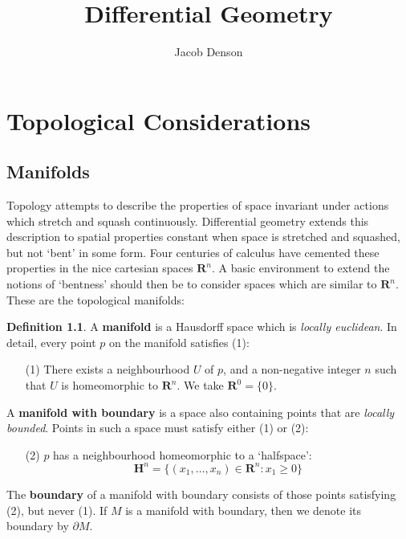 \documentclass[12pt]{report}
\title{Differential Geometry}
\author{Jacob Denson}
\theoremstyle{plain}
\theoremstyle{definition}
\newtheorem*{defi}{Definition}
\newenvironment{definition}
    {\begin{samepage}\begin{framed}\begin{defi}}
    {\end{defi}\end{framed}\end{samepage}}
\begin{document}

\maketitle

\tableofcontents


\chapter{Topological Considerations}

\section{Manifolds}

Topology attempts to describe the properties of space invariant under actions which stretch and squash continuously. Differential geometry extends this description to spatial properties constant when space is stretched and squashed, but not `bent' in some form. Four centuries of calculus have cemented these properties in the nice cartesian spaces $\mathbf{R}^n$. A basic environment to extend the notions of `bentness' should then be to consider spaces which are similar to $\mathbf{R}^n$. These are the topological manifolds:

\begin{definition}
    A {\bf manifold} is a Hausdorff space which is {\it locally euclidean}. In detail, every point $p$ on the manifold satisfies (1):
    \begin{enumerate}
        \item[(1)] There exists a neighbourhood $U$ of $p$, and a non-negative integer $n$ such that $U$ is homeomorphic to $\mathbf{R}^n$. We take $\mathbf{R}^0 = \{0\}$.
    \end{enumerate}
    A {\bf manifold with boundary} is a space also containing points that are {\it locally bounded}. Points in such a space must satisfy either (1) or (2):
    \begin{enumerate}
        \item[(2)] $p$ has a neighbourhood homeomorphic to a `halfspace':
        \[ \mathbf{H}^n = \{ (x_1, \dots, x_n) \in \mathbf{R}^n: x_1 \geq 0 \} \]
    \end{enumerate}
    The {\bf boundary} of a manifold with boundary consists of those points satisfying (2), but never (1). If $M$ is a manifold with boundary, then we denote its boundary by $\partial M$.
\end{definition}
\end{document}

